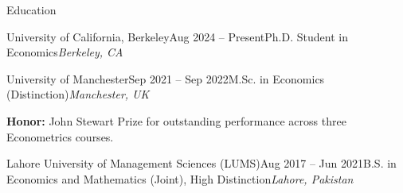 \documentclass{../resume}
\begin{document}
\begin{rSection}{Education}

\begin{rSubsection}{University of California, Berkeley}{Aug 2024 -- Present}{Ph.D. Student in Economics}{\em Berkeley, CA}
\item[]
\vspace{-1.1em}
\end{rSubsection}


\begin{rSubsection}{University of Manchester}{Sep 2021 -- Sep 2022}{M.Sc. in Economics (Distinction)}{\em Manchester, UK}
\item[] \textbf{Honor:} John Stewart Prize for outstanding performance across three Econometrics courses.
\end{rSubsection}


\begin{rSubsection}{Lahore University of Management Sciences (LUMS)}{Aug 2017 -- Jun 2021}{B.S. in Economics and Mathematics (Joint), High Distinction}{\em Lahore, Pakistan}
\item[]
\vspace{-1.1em}
\end{rSubsection}

\end{rSection}
\end{document}
